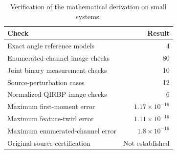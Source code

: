 \begin{table}[htbp]\centering\small
\caption{Verification of the mathematical derivation on small systems.}
\begin{tabular}{lr}\toprule
Check & Result\\\midrule
Exact angle reference models & 4\\
Enumerated-channel image checks & 80\\
Joint binary measurement checks & 10\\
Source-perturbation cases & 12\\
Normalized QIRBP image checks & 6\\
Maximum first-moment error & $1.17\times10^{-16}$\\
Maximum feature-twirl error & $1.11\times10^{-16}$\\
Maximum enumerated-channel error & $1.8\times10^{-16}$\\
Original source certification & Not established\\
\bottomrule\end{tabular}\end{table}
